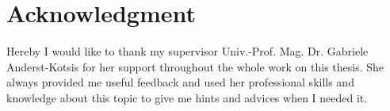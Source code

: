 \chapter*{Acknowledgment}

Hereby I would like to thank my supervisor Univ.-Prof. Mag. Dr. Gabriele Anderst-Kotsis for her support throughout the whole work on this thesis. She always provided me useful feedback and used her professional skills and knowledge about this topic to give me hints and advices when I needed it.
